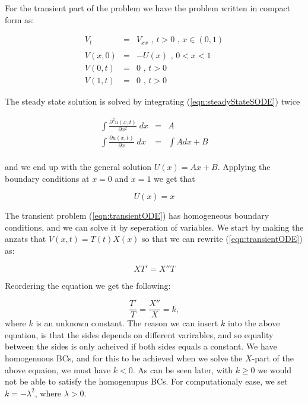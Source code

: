 \documentclass{article}
\begin{document}
For the transient part of the problem we have the problem written in compact form as:

\begin{subequations}
	\begin{eqnarray}
	\label{eqn:transientODE}
	V_t &=& V_{xx} \textit{ , } t>0 \textit{ , } x \in (0,1) \\ \nonumber
	\\
	\label{eqn:transientIC}
	V(x,0) &=& -U(x) \textit{ , } 0<x<1 \\
	V(0,t) &=& 0 \textit{ , } t>0 \\
	V(1,t) &=& 0 \textit{ , } t>0
	\end{eqnarray}
\end{subequations}


The steady state solution is solved by integrating (\ref{eqn:steadyStateSODE}) twice

\begin{eqnarray}
\nonumber
\int \frac{\partial^2 u(x,t)}{\partial x^2}\;dx &=& A \\ \nonumber
\int \frac{\partial u(x,t)}{\partial x}\;dx &=& \int Adx +B \\ \nonumber
\end{eqnarray}

and we end up with the general solution $U(x) = Ax + B$. Applying the boundary conditions at $x=0$ and $x=1$ we get that 

\begin{equation}
U(x) = x
\label{eqn:UsteadyState1D}
\end{equation}

The transient problem (\ref{eqn:transientODE}) has homogeneous boundary conditions, and we can solve it by seperation of variables. We start by making the anzats that $V(x,t) = T(t)X(x)$ so that we can rewrite (\ref{eqn:transientODE}) as:

\begin{equation}
XT'=X''T 
\end{equation}

Reordering the equation we get the following:

\begin{equation}
\frac{T'}{T} = \frac{X''}{X} = k,
\end{equation}
where $k$ is an unknown constant. The reason we can insert $k$ into the above equation, is that the sides depends on different varirables, and so equality between the sides is only acheived if both sides equals a constant. We have homogenuous BCs, and for this to be achieved when we solve the $X$-part of the above equaion, we must have $k <0$. As can be seen later, with $k\geq 0$ we would not be able to satisfy the homogenupus BCs. For computationaly ease, we set $k = -\lambda^2$, where $\lambda > 0$. \\
\end{document}
